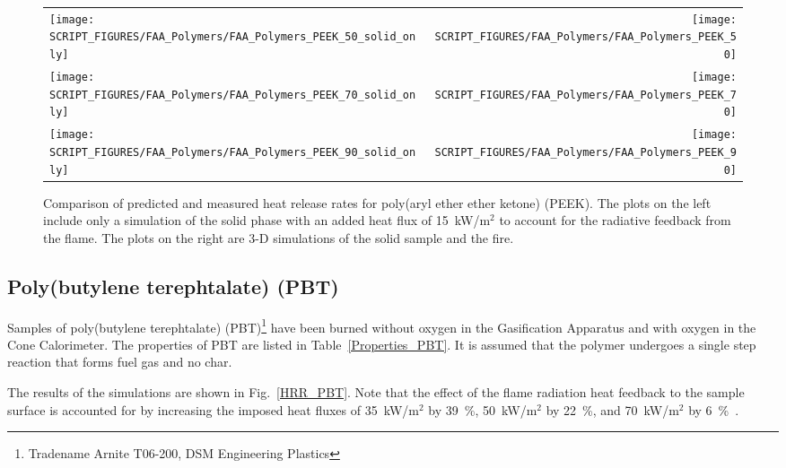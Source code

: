 \begin{figure}[p]
\begin{tabular*}{\textwidth}{l@{\extracolsep{\fill}}r}
\texttt{[image: SCRIPT\_FIGURES/FAA\_Polymers/FAA\_Polymers\_PEEK\_50\_solid\_only]} &
\texttt{[image: SCRIPT\_FIGURES/FAA\_Polymers/FAA\_Polymers\_PEEK\_50]} \\
\texttt{[image: SCRIPT\_FIGURES/FAA\_Polymers/FAA\_Polymers\_PEEK\_70\_solid\_only]} &
\texttt{[image: SCRIPT\_FIGURES/FAA\_Polymers/FAA\_Polymers\_PEEK\_70]} \\
\texttt{[image: SCRIPT\_FIGURES/FAA\_Polymers/FAA\_Polymers\_PEEK\_90\_solid\_only]} &
\texttt{[image: SCRIPT\_FIGURES/FAA\_Polymers/FAA\_Polymers\_PEEK\_90]}
\end{tabular*}
\caption[Heat release rate of poly(aryl ether ether ketone) (PEEK).]{Comparison of predicted and measured heat release rates for poly(aryl ether ether ketone) (PEEK). The plots on the left include only a simulation of the solid phase with an added heat flux of 15~kW/m$^2$ to account for the radiative feedback from the flame. The plots on the right are 3-D simulations of the solid sample and the fire.}
\label{HRR_PEEK}
\end{figure}

\clearpage


\subsection{Poly(butylene terephtalate) (PBT)}

Samples of poly(butylene terephtalate) (PBT)\footnote{Tradename Arnite T06-200, DSM Engineering Plastics} have been burned without oxygen in the Gasification Apparatus and with oxygen in the Cone Calorimeter. The properties of PBT are listed in Table~\ref{Properties_PBT}. It is assumed that the polymer undergoes a single step reaction that forms fuel gas and no char.

The results of the simulations are shown in Fig.~\ref{HRR_PBT}. Note that the effect of the flame radiation heat feedback to the sample surface is accounted for by increasing the imposed heat fluxes of 35~kW/m$^2$ by 39~\%, 50~kW/m$^2$ by 22~\%, and 70~kW/m$^2$ by 6~\%~\cite{Kempel:1}.


